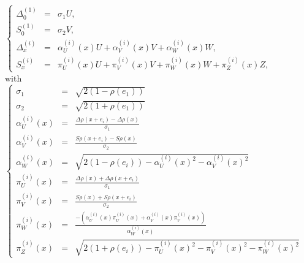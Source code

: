 \documentclass[12pt]{article}
\theoremstyle{Theorem}
\begin{document}
$\left\{
  \begin{array}{rlc}
  \Delta^{\scriptscriptstyle (1)}_{\scriptscriptstyle 0} & = & \sigma_1U, \\
  S^{\scriptscriptstyle (1)}_{\scriptscriptstyle 0} & = & \sigma_2V, \\
  \Delta^{\scriptscriptstyle (i)}_{\scriptscriptstyle  x}& = &  \alpha^{\scriptscriptstyle(i)}_{U}(x)U +  \alpha^{\scriptscriptstyle(i)}_{V}(x) V +  \alpha^{\scriptscriptstyle(i)}_{W}(x) W, \\
  S^{\scriptscriptstyle (i)}_{\scriptscriptstyle x} & = &    \pi^{\scriptscriptstyle(i)}_{U}(x)U +  \pi^{\scriptscriptstyle(i)}_{V}(x) V +  \pi^{\scriptscriptstyle(i)}_{W}(x) W +  \pi^{\scriptscriptstyle(i)}_{Z}(x)Z, 
\end{array}\right.$ \\
with 
$\left\{
 \begin{array}{rlc}
 \sigma_1 & = &  \sqrt{2(1-\rho(e_1))} \\
 \sigma_2 & = & \sqrt{2(1+\rho(e_1))} \\
   \alpha^{\scriptscriptstyle(i)}_{U}(x) & = & \frac{\Delta \rho(x+e_i) -\Delta \rho(x)}{\sigma_1} \\
   \alpha^{\scriptscriptstyle(i)}_{V}(x) & = &  \frac{S\rho(x+e_i)-S\rho(x)}{\sigma_{2}}  \\
   \alpha^{\scriptscriptstyle(i)}_{W}(x)& = & \sqrt{2(1 - \rho(e_{i})) - \alpha^{\scriptscriptstyle(i)}_{U}(x)^{2} - \alpha^{\scriptscriptstyle(i)}_{V}(x)^{2}} \\ 
   \pi^{\scriptscriptstyle(i)}_{U}(x) & = &  \frac{\Delta \rho(x) + \Delta \rho(x+e_i)}{\sigma_1} \\
    \pi^{\scriptscriptstyle(i)}_{V}(x) & = & \frac{S \rho(x) + S\rho(x+e_i)}{\sigma_{2}} \\
   \pi^{\scriptscriptstyle(i)}_{W}(x) & = & \frac{- \left(\alpha^{\scriptscriptstyle(i)}_{U}(x)\pi^{\scriptscriptstyle(i)}_{U}(x) + \alpha^{\scriptscriptstyle(i)}_{V}(x)\pi^{\scriptscriptstyle(i)}_{V}(x)\right) }{\alpha^{\scriptscriptstyle(i)}_{W}(x)}\\
   \pi^{\scriptscriptstyle(i)}_{Z}(x)& = & \sqrt{2(1 + \rho(e_i)) - \pi^{\scriptscriptstyle(i)}_{U}(x)^{2} - \pi^{\scriptscriptstyle(i)}_{V}(x)^{2} - \pi^{\scriptscriptstyle(i)}_{W}(x)^{2}}
\end{array}\right.$ 
\end{document}
